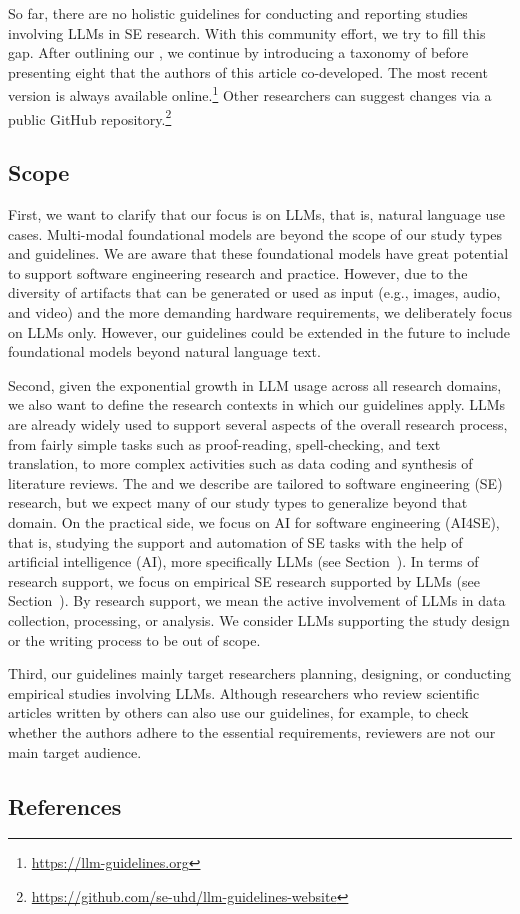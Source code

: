 So far, there are no holistic guidelines for conducting and reporting studies involving LLMs in SE research.
With this community effort, we try to fill this gap.
After outlining our \scope, we continue by introducing a taxonomy of \studytypes before presenting eight \guidelines that the authors of this article co-developed.
The most recent version is always available online.\footnote{\url{https://llm-guidelines.org}}
Other researchers can suggest changes via a public GitHub repository.\footnote{\url{https://github.com/se-uhd/llm-guidelines-website}}

\subsection{Scope}
\label{sec:scope}

First, we want to clarify that our focus is on LLMs, that is, natural language use cases.
Multi-modal foundational models are beyond the scope of our study types and guidelines.
We are aware that these foundational models have great potential to support software engineering research and practice.
However, due to the diversity of artifacts that can be generated or used as input (e.g., images, audio, and video) and the more demanding hardware requirements, we deliberately focus on LLMs only.
However, our guidelines could be extended in the future to include foundational models beyond natural language text.

Second, given the exponential growth in LLM usage across all research domains, we also want to define the research contexts in which our guidelines apply.
LLMs are already widely used to support several aspects of the overall research process, from fairly simple tasks such as proof-reading, spell-checking, and text translation, to more complex activities such as data coding and synthesis of literature reviews.
The \studytypes and \guidelines we describe are tailored to software engineering (SE) research, but we expect many of our study types to generalize beyond that domain.
On the practical side, we focus on AI for software engineering (AI4SE), that is, studying the support and automation of SE tasks with the help of artificial intelligence (AI), more specifically LLMs (see Section~\llmsforengineers).
In terms of research support, we focus on empirical SE research supported by LLMs (see Section~\llmsforresearcher).
By research support, we mean the active involvement of LLMs in data collection, processing, or analysis.
We consider LLMs supporting the study design or the writing process to be out of scope.

Third, our guidelines mainly target researchers planning, designing, or conducting empirical studies involving LLMs.
Although researchers who review scientific articles written by others can also use our guidelines, for example, to check whether the authors adhere to the essential \must requirements, reviewers are not our main target audience.

\subsection{References}





